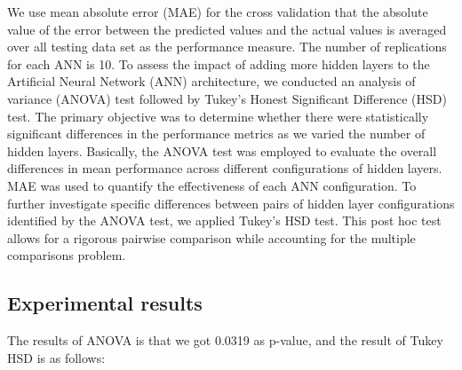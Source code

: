 \documentclass[manuscript,screen,review]{acmart}
\begin{document}
We use mean absolute error (MAE) for the cross validation that the absolute value of the error between the predicted values and the actual values is averaged over all testing data set as the performance measure. The number of replications for each ANN is 10.
To assess the impact of adding more hidden layers to the Artificial Neural Network (ANN) architecture, we conducted an analysis of variance (ANOVA) test followed by Tukey's Honest Significant Difference (HSD) test. The primary objective was to determine whether there were statistically significant differences in the performance metrics as we varied the number of hidden layers. Basically, the ANOVA test was employed to evaluate the overall differences in mean performance across different configurations of hidden layers. MAE was used to quantify the effectiveness of each ANN configuration. To further investigate specific differences between pairs of hidden layer configurations identified by the ANOVA test, we applied Tukey's HSD test. This post hoc test allows for a rigorous pairwise comparison while accounting for the multiple comparisons problem.

\subsection{Experimental results}



The results of ANOVA is that we got 0.0319 as p-value, and the result of Tukey HSD is as follows:  
        
\end{document}
